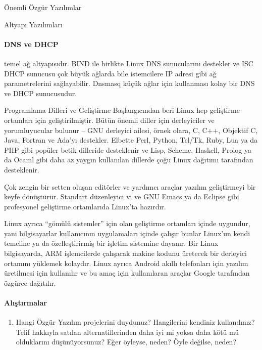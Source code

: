 \begin{section}{Önemli Özgür Yazılımlar}
\begin{subsection}{Altyapı Yazılımları}
\paragraph{DNS ve DHCP}{temel ağ altyapısıdır. BIND ile birlikte Linux DNS sunucularını destekler ve ISC DHCP sunucusu çok büyük ağlarda bile istemcilere IP adresi gibi ağ parametrelerini sağlayabilir. Dnsmasq küçük ağlar için kullanması kolay bir DNS ve DHCP sunucusudur.}
\end{subsection}
\begin{subsection}{Programlama Dilleri ve Geliştirme}
Başlangıcından beri Linux hep geliştirme ortamları için geliştirilmiştir. Bütün önemli diller için derleyiciler ve yorumluyucular bulunur – GNU derleyici ailesi, örnek olara, C, C++, Objektif C, Java, Fortran ve Ada'yı destekler. Elbette Perl, Python, Tcl/Tk, Ruby, Lua ya da PHP gibi popüler betik dilleride desteklenir ve Lisp, Scheme, Haskell, Prolog ya da Ocaml gibi daha az yaygın kullanılan dillerde çoğu Linux dağıtımı tarafından desteklenir.

Çok zengin bir setten oluşan editörler ve yardımcı araçlar yazılım geliştirmeyi bir keyfe dönüştürür. Standart düzenleyici vi ve GNU Emacs ya da Eclipse gibi profesyonel geliştirme ortamlarıda Linux'ta hazırdır.

Linux ayrıca “gömülü sistemler” için olan geliştirme ortamları içinde uygundur, yani bilgisayarlar kullanıcının uygulamaları içinde çalışır bunlar Linux'un kendi temeline ya da özelleştirirmiş bir işletim sistemine dayanır. Bir Linux bilgisayarda, ARM işlemcilerde çalışacak makine kodunu üretecek bir derleyici ortamını yüklemek kolaydır. Linux ayrıca Android akıllı telefonları için yazılım üretilmesi için kullanılır ve bu amaç için kullanılaran araçlar Google tarafından özgürce dağıtılır.
\end{subsection}
\paragraph{{\Huge{\PencilLeftDown}}Alıştırmalar}{
\begin{enumerate}
 \item Hangi Özgür Yazılım projelerini duydunuz? Hangilerini kendiniz kullandınız? Telif hakkıyla satılan alternatiflerinden daha iyi mi yoksa daha kötü mü olduklarını düşünüyorsunuz? Eğer öyleyse, neden? Öyle değilse, neden?
\end{enumerate}}
\end{section}
